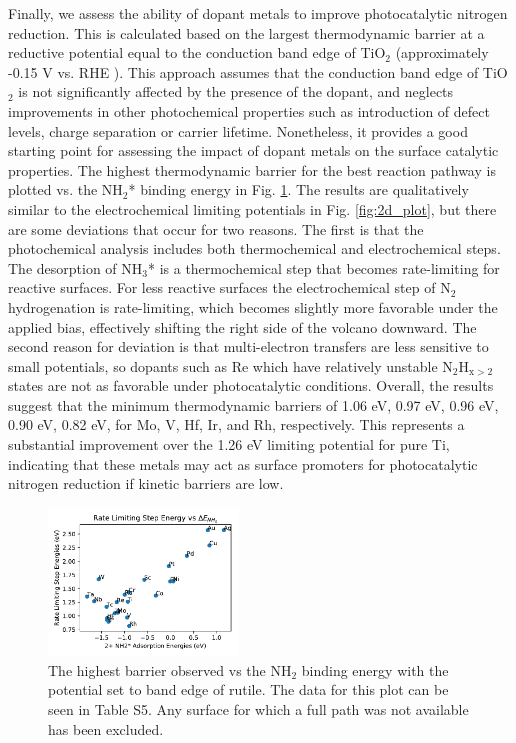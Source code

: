 Finally, we assess the ability of dopant metals to improve photocatalytic nitrogen reduction. This is calculated based on the largest thermodynamic barrier at a reductive potential equal to the conduction band edge of TiO$_2$ (approximately -0.15 V vs. RHE \cite{Nozik_1996}). This approach assumes that the conduction band edge of TiO$_2$ is not significantly affected by the presence of the dopant, and neglects improvements in other photochemical properties such as introduction of defect levels, charge separation or carrier lifetime. Nonetheless, it provides a good starting point for assessing the impact of dopant metals on the surface catalytic properties. 
The highest thermodynamic barrier for the best reaction pathway is plotted vs. the NH$_2$* binding energy in Fig. \ref{fig:NH2_thermo}. The results are qualitatively similar to the electrochemical limiting potentials in Fig. \ref{fig:2d_plot}, but there are some deviations that occur for two reasons. The first is that the photochemical analysis includes both thermochemical and electrochemical steps. The desorption of NH$_3$* is a thermochemical step that becomes rate-limiting for reactive surfaces. For less reactive surfaces the electrochemical step of N$_2$ hydrogenation is rate-limiting, which becomes slightly more favorable under the applied bias, effectively shifting the right side of the volcano downward. The second reason for deviation is that multi-electron transfers are less sensitive to small potentials, so dopants such as Re which have relatively unstable N$_2$H$_{\mathrm{x}>2}$ states are not as favorable under photocatalytic conditions. Overall, the results suggest that the minimum thermodynamic barriers of 1.06 eV, 0.97 eV, 0.96 eV, 0.90 eV, 0.82 eV, for Mo, V, Hf, Ir, and  Rh, respectively. This represents a substantial improvement over the 1.26 eV limiting potential for pure Ti, indicating that these metals may act as surface promoters for photocatalytic nitrogen reduction if kinetic barriers are low.

\begin{figure}
    \centering
    \includegraphics[width=0.45\textwidth]{Images/NH2_v_rate_limiting.pdf}

    \caption{The highest barrier observed vs the NH$_2$ binding energy with the potential set to band edge of rutile. The data for this plot can be seen in Table S5. Any surface for which a full path was not available has been excluded.}
    \label{fig:NH2_thermo}
    
\end{figure}

